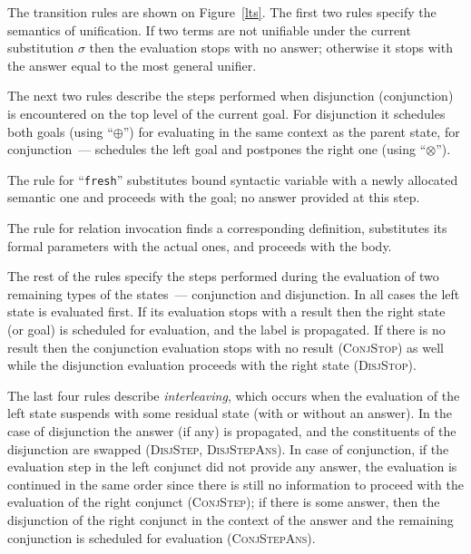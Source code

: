 The transition rules are shown on Figure~\ref{lts}. The first two rules specify the semantics of unification. If two terms are not unifiable under the current substitution
$\sigma$ then the evaluation stops with no answer; otherwise it stops with the answer equal to the most general unifier.

The next two rules describe the steps performed when disjunction (conjunction) is encountered on the top level of the current goal. For disjunction it schedules both goals (using ``$\oplus$'') for
evaluating in the same context as the parent state, for conjunction~--- schedules the left goal and postpones the right one (using ``$\otimes$'').

The rule for ``\lstinline|fresh|'' substitutes bound syntactic variable with a newly allocated semantic one and proceeds with the goal; no answer provided at this step.

The rule for relation invocation finds a corresponding definition, substitutes its formal parameters with the actual ones, and proceeds with the body.

The rest of the rules specify the steps performed during the evaluation of two remaining types of the states~--- conjunction and disjunction. In all cases the left state
is evaluated first. If its evaluation stops with a result then the right state (or goal) is scheduled for evaluation, and the label is propagated. If there is no result then
the conjunction evaluation stops with no result (\textsc{ConjStop}) as well while the disjunction evaluation proceeds with the right state (\textsc{DisjStop}).

The last four rules describe \emph{interleaving}, which occurs when the evaluation of the left state suspends with some residual state (with or without an answer). In the case of disjunction
the answer (if any) is propagated, and the constituents of the disjunction are swapped (\textsc{DisjStep}, \textsc{DisjStepAns}). In case of conjunction, if the evaluation step in
the left conjunct did not provide any answer, the evaluation is continued in the same order since there is still no information to proceed with the evaluation of the right
conjunct (\textsc{ConjStep}); if there is some answer, then the disjunction of the right conjunct in the context of the answer and the remaining conjunction is
scheduled for evaluation (\textsc{ConjStepAns}).

